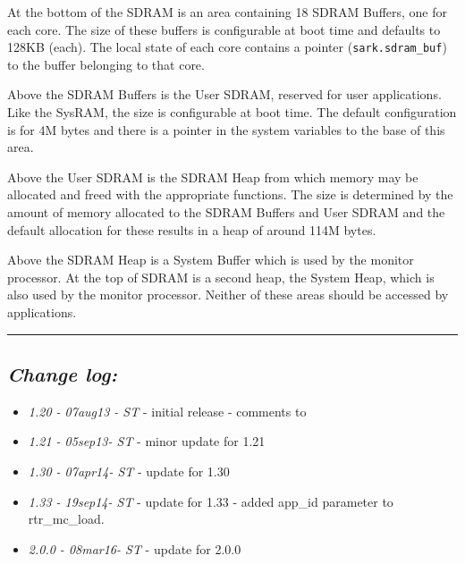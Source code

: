 
At the bottom of the SDRAM is an area containing 18 SDRAM Buffers,
one for each core. The size of these buffers is configurable at boot
time and defaults to 128KB (each). The local state of each core
contains a pointer (\texttt{sark.sdram\_buf}) to the buffer belonging
to that core.

Above the SDRAM Buffers is the User SDRAM, reserved for user
applications. Like the SysRAM, the size is configurable at boot
time. The default configuration is for 4M bytes and there is a pointer
in the system variables to the base of this area.

Above the User SDRAM is the SDRAM Heap from which memory may be
allocated and freed with the appropriate functions. The size is
determined by the amount of memory allocated to the SDRAM Buffers and
User SDRAM and the default allocation for these results in
a heap of around 114M bytes.

Above the SDRAM Heap is a System Buffer which is used by the monitor
processor. At the top of SDRAM is a second heap, the System Heap,
which is also used by the monitor processor. Neither of these areas
should be accessed by applications.

\rule{\linewidth}{1pt}

\subsection{\itshape Change log:}

\begin{itemize}
\item {\itshape 1.20 - 07aug13 - ST} - initial release - comments to
  {\itshape \Email}
\item {\itshape 1.21 - 05sep13- ST} - minor update for 1.21
\item {\itshape 1.30 - 07apr14- ST} - update for 1.30
\item {\itshape 1.33 - 19sep14- ST} - update for 1.33 - added app\_id
parameter to rtr\_mc\_load.
\item {\itshape 2.0.0 - 08mar16- ST} - update for 2.0.0

\end{itemize}


